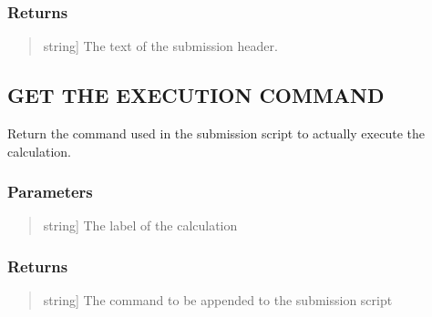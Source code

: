 \documentclass[a4paper,11pt,english]{sphinxmanual}
\begin{document}
\begin{fulllineitems}
\begin{fulllineitems}
\begin{quote}
\begin{description}
\end{description}
\end{quote}


\subsubsection{Returns}
\label{\detokenize{apireference:id56}}\begin{quote}
\begin{description}
\sphinxlineitem{submission\_header}{[}string{]}
\sphinxAtStartPar
The text of the submission header.

\end{description}
\end{quote}

\end{fulllineitems}


\begin{fulllineitems}
\label{\detokenize{apireference:sscha.Cluster.Cluster.get_execution_command}}
\pysigstartsignatures
{}
\pysigstopsignatures

\subsection{GET THE EXECUTION COMMAND}
\label{\detokenize{apireference:get-the-execution-command}}
\sphinxAtStartPar
Return the command used in the submission script to actually execute the calculation.


\subsubsection{Parameters}
\label{\detokenize{apireference:id57}}\begin{quote}
\begin{description}
\sphinxlineitem{label}{[}string{]}
\sphinxAtStartPar
The label of the calculation

\end{description}
\end{quote}


\subsubsection{Returns}
\label{\detokenize{apireference:id58}}\begin{quote}
\begin{description}
\sphinxlineitem{commnad}{[}string{]}
\sphinxAtStartPar
The command to be appended to the submission script


\end{description}
\end{quote}
\end{fulllineitems}
\end{fulllineitems}
\end{document}
